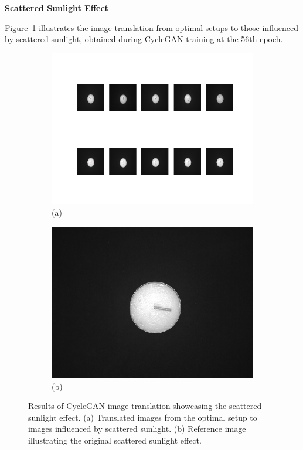 \documentclass[12pt,DIV14,BCOR12mm,a4paper,footinclude=false,headinclude,parskip=half-,twoside,openright,cleardoublepage=empty,toc=index,bibliography=totoc,listof=totoc]{scrreprt}
\numberwithin{equation}{chapter}
\begin{document}
\textbf{Scattered Sunlight Effect}

Figure~\ref{fig:scattered_sunlight_result} illustrates the image translation from optimal setups to those influenced by scattered sunlight, obtained during CycleGAN training at the 56th epoch. 

\begin{figure}
    \centering
    \begin{subfigure}[b]{0.85\textwidth}
        \centering
        \includegraphics[width=\textwidth]{../media/candles_sunlight.png}
        \caption*{(a)}
    \end{subfigure}
    \hfill
    \begin{subfigure}[b]{0.25\textwidth}
        \centering
        \includegraphics[width=\textwidth]{../media/candles_sunlight_real.png}
        \caption*{(b)}
    \end{subfigure}
    \caption{Results of CycleGAN image translation showcasing the scattered sunlight effect. (a) Translated images from the optimal setup to images influenced by scattered sunlight. (b) Reference image illustrating the original scattered sunlight effect.}
    \label{fig:scattered_sunlight_result}
\end{figure}
\end{document}
